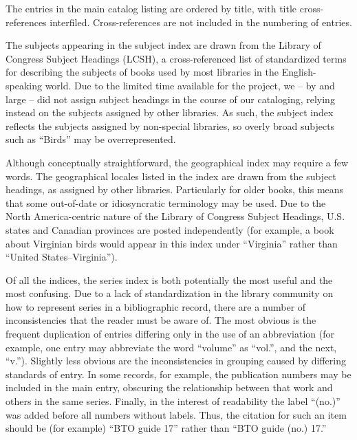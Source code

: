 The entries in the main catalog listing are ordered by title, with title
cross-references interfiled. Cross-references are not included in the numbering
of entries.

The subjects appearing in the subject index are drawn from the Library of
Congress Subject Headings (LCSH), a cross-referenced list of standardized terms
for describing the subjects of books used by most libraries in the
English-speaking world. Due to the limited time available for the project,
we -- by and large -- did not assign subject headings in the course of our
cataloging, relying instead on the subjects assigned by other libraries. As
such, the subject index reflects the subjects assigned by non-special libraries,
so overly broad subjects such as ``Birds'' may be overrepresented.

Although conceptually straightforward, the geographical index may require a few
words. The geographical locales listed in the index are drawn from the subject
headings, as assigned by other libraries. Particularly for older books, this
means that some out-of-date or idiosyncratic terminology may be used. Due to the
North America-centric nature of the Library of Congress Subject Headings, U.S.
states and Canadian provinces are posted independently (for example, a book about
Virginian birds would appear in this index under ``Virginia'' rather than ``United
States--Virginia'').

Of all the indices, the series index is both potentially the most useful and
the most confusing. Due to a lack of standardization in the library community
on how to represent series in a bibliographic record, there are a number of
inconsistencies that the reader must be aware of. The most obvious is the
frequent duplication of entries differing only in the use of an abbreviation
(for example, one entry may abbreviate the word ``volume'' as ``vol.'', and the
next, ``v.''). Slightly less obvious are the inconsistencies in grouping caused
by differing standards of entry. In some records, for example, the publication
numbers may be included in the main entry, obscuring the relationship between that
work and others in the same series. Finally, in the interest of readability the
label ``(no.)'' was added before all numbers without labels. Thus, the citation
for such an item should be (for example) ``BTO guide 17'' rather than ``BTO guide
(no.) 17.''
